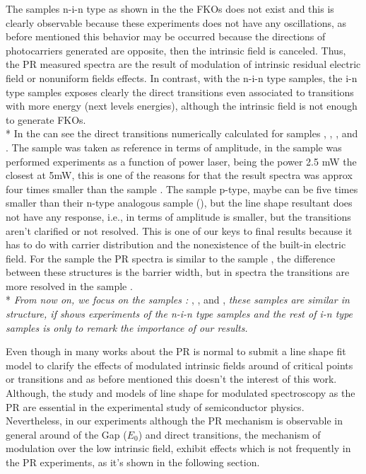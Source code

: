 The samples n-i-n type as shown in the  the FKOs does not exist and this is clearly observable because these experiments does not have any oscillations, as before mentioned this behavior may be occurred because the directions  of photocarriers generated are opposite, then the intrinsic field is canceled. Thus, the PR measured spectra are the result of modulation of intrinsic residual electric field or  nonuniform fields effects\cite{delsole1978effect}.  
In contrast,  with the n-i-n type samples, the i-n type samples exposes clearly the direct transitions even associated to transitions with more energy (next levels energies), although the intrinsic field is not enough to generate FKOs. \\*
In the  can see the direct transitions numerically calculated for samples , , ,  and . The sample  was taken as reference in terms of amplitude, in the sample  was performed experiments as a function of power laser, being the power 2.5 mW the closest at 5mW, this is one of the reasons for that the result spectra was approx four times smaller than the sample .   The sample  p-type, maybe can be five times smaller than their n-type analogous sample (), but the line shape resultant does not have any response, i.e., in terms of amplitude is smaller, but the transitions aren't clarified or not resolved. This is one of our keys to final results because it has to do with carrier distribution and the nonexistence of the built-in electric field. For the sample  the PR spectra is similar to the sample  , the difference between these structures is the barrier width, but in spectra the transitions are more resolved in the sample .  \\*
\emph{From now on, we focus on the samples :} , ,  and , \emph{these samples are similar in structure, if shows experiments of the n-i-n type samples and the rest of i-n type samples is only to remark the importance of our results. }

Even though in many works about the PR is normal to submit a line shape fit model  to clarify the effects of modulated intrinsic fields around of critical points or transitions and as before mentioned this doesn't the interest of this work. Although, the study and models of line shape for modulated spectroscopy as the PR are essential in the experimental study of semiconductor physics\cite{cardona1969modulation,seraphin1966bandstructure}.  Nevertheless, in our experiments  although the PR mechanism is observable in general around of the Gap ($E_0$) and direct transitions, the mechanism of modulation over the low intrinsic field, exhibit  effects  which is not frequently in the PR experiments, as it's shown in the following section. 

